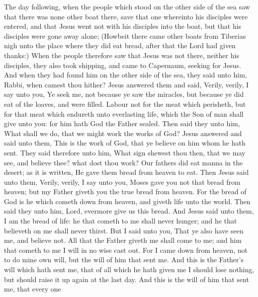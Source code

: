  The day following, when the people which stood on the
other side of the sea saw that there was none other boat there, save
that one whereinto his disciples were entered, and that Jesus went not
with his disciples into the boat, but that his disciples were gone away
alone;  (Howbeit there came other boats from Tiberias
nigh unto the place where they did eat bread, after that the Lord had
given thanks:)  When the people therefore saw that Jesus
was not there, neither his disciples, they also took shipping, and came
to Capernaum, seeking for Jesus.  And when they had found
him on the other side of the sea, they said unto him, Rabbi, when camest
thou hither?  Jesus answered them and said, Verily,
verily, I say unto you, Ye seek me, not because ye saw the miracles, but
because ye did eat of the loaves, and were filled. 
Labour not for the meat which perisheth, but for that meat which
endureth unto everlasting life, which the Son of man shall give unto
you: for him hath God the Father sealed.  Then said they
unto him, What shall we do, that we might work the works of God?
 Jesus answered and said unto them, This is the work of
God, that ye believe on him whom he hath sent.  They said
therefore unto him, What sign shewest thou then, that we may see, and
believe thee? what dost thou work?  Our fathers did eat
manna in the desert; as it is written, He gave them bread from heaven to
eat.  Then Jesus said unto them, Verily, verily, I say
unto you, Moses gave you not that bread from heaven; but my Father
giveth you the true bread from heaven.  For the bread of
God is he which cometh down from heaven, and giveth life unto the world.
 Then said they unto him, Lord, evermore give us this
bread.  And Jesus said unto them, I am the bread of life:
he that cometh to me shall never hunger; and he that believeth on me
shall never thirst.  But I said unto you, That ye also
have seen me, and believe not.  All that the Father
giveth me shall come to me; and him that cometh to me I will in no wise
cast out.  For I came down from heaven, not to do mine
own will, but the will of him that sent me.  And this is
the Father's will which hath sent me, that of all which he hath given me
I should lose nothing, but should raise it up again at the last day.
 And this is the will of him that sent me, that every one
